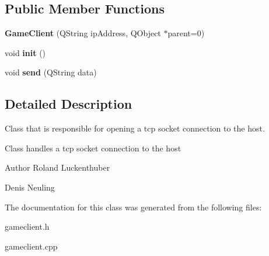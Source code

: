 \subsection*{\-Public \-Member \-Functions}
\begin{DoxyCompactItemize}
\item 
\hypertarget{classGameClient_a6c6faf6d8e0524f9b75041b3eaeb718d}{{\bfseries \-Game\-Client} (\-Q\-String ip\-Address, \-Q\-Object $\ast$parent=0)}\label{classGameClient_a6c6faf6d8e0524f9b75041b3eaeb718d}

\item 
\hypertarget{classGameClient_a96c861f5f70e645a28cf6e7a042dfc9f}{void {\bfseries init} ()}\label{classGameClient_a96c861f5f70e645a28cf6e7a042dfc9f}

\item 
\hypertarget{classGameClient_ad6130cb3cddc509730c948e0177c1be2}{void {\bfseries send} (\-Q\-String data)}\label{classGameClient_ad6130cb3cddc509730c948e0177c1be2}

\end{DoxyCompactItemize}


\subsection{\-Detailed \-Description}
\-Class that is responsible for opening a tcp socket connection to the host. 

\-Class handles a tcp socket connection to the host

\begin{DoxyAuthor}{\-Author}
\-Roland \-Luckenthuber 

\-Denis \-Neuling 
\end{DoxyAuthor}


\-The documentation for this class was generated from the following files\-:\begin{DoxyCompactItemize}
\item 
gameclient.\-h\item 
gameclient.\-cpp\end{DoxyCompactItemize}
